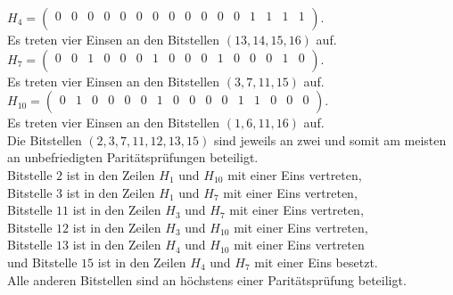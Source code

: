 \begin{Beispiel}
        $H_4= \left( \begin{array}{rrrrrrrrrrrrrrrr}
            0 & 0 & 0 & 0 & 0 & 0 & 0 & 0 & 0 & 0 & 0 & 0 & 1 & 1 & 1 & 1 \\
           \end{array}\right). 
        $\\
        Es treten vier Einsen an den Bitstellen $(13, 14, 15, 16)$ auf.\\
        
        $H_7= \left( \begin{array}{rrrrrrrrrrrrrrrr}
            0 & 0 & 1 & 0 & 0 & 0 & 1 & 0 & 0 & 0 & 1 & 0 & 0 & 0 & 1 & 0 \\
           \end{array}\right). 
        $\\
        Es treten vier Einsen an den Bitstellen $(3, 7, 11, 15)$ auf.\\
        
        $H_{10}= \left( \begin{array}{rrrrrrrrrrrrrrrr}
            0 & 1 & 0 & 0 & 0 & 0 & 1 & 0 & 0 & 0 & 0 & 1 & 1 & 0 & 0 & 0 \\
           \end{array}\right). 
        $\\
        Es treten vier Einsen an den Bitstellen $(1, 6, 11, 16)$ auf.\\
        
        
        Die Bitstellen $(2, 3, 7, 11, 12, 13, 15)$ sind jeweils an zwei und somit am meisten an unbefriedigten Paritätsprüfungen beteiligt.\\ 
        Bitstelle $2$ ist in den Zeilen $H_1$ und $H_{10}$ mit einer Eins vertreten,\\ 
        Bitstelle $3$ ist in den Zeilen $H_1$ und $H_7$ mit einer Eins vertreten,\\
        Bitstelle $11$ ist in den Zeilen $H_3$ und $H_7$ mit einer Eins vertreten,\\
        Bitstelle $12$ ist in den Zeilen $H_3$ und $H_{10}$ mit einer Eins vertreten,\\
        Bitstelle $13$ ist in den Zeilen $H_4$ und $H_{10}$ mit einer Eins vertreten\\
        und Bitstelle $15$ ist in den Zeilen $H_4$ und $H_7$ mit einer Eins besetzt.\\
        Alle anderen Bitstellen sind an höchstens einer Paritätsprüfung beteiligt.\\
        

\end{Beispiel}
